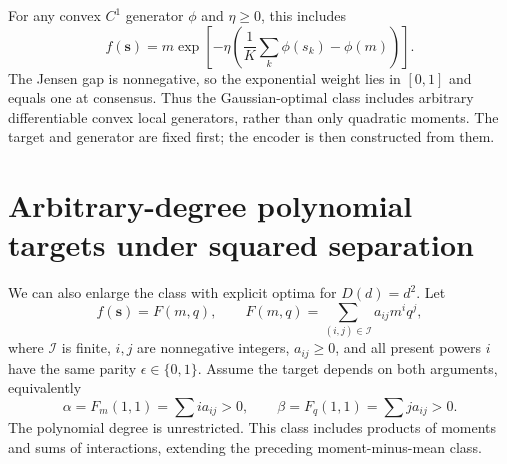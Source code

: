 \documentclass[11pt,letterpaper]{article}
\theoremstyle{remark}
\begin{document}
For any convex $C^1$ generator $\phi$ and $\eta\ge0$, this includes
$$
 f(\mathbf s)=m\exp\!\left[-\eta\left(\frac1K\sum_k\phi(s_k)-\phi(m)\right)\right].
$$
The Jensen gap is nonnegative, so the exponential weight lies in $[0,1]$ and equals one at consensus. Thus the Gaussian-optimal class includes arbitrary differentiable convex local generators, rather than only quadratic moments. The target and generator are fixed first; the encoder is then constructed from them.

\section{Arbitrary-degree polynomial targets under squared separation}
We can also enlarge the class with explicit optima for $D(d)=d^2$. Let
\begin{equation}
 f(\mathbf s)=F(m,q),\qquad
 F(m,q)=\sum_{(i,j)\in\mathcal I}a_{ij}m^i q^j,
 \label{eq:polyclass}
\end{equation}
where $\mathcal I$ is finite, $i,j$ are nonnegative integers, $a_{ij}\ge0$, and all present powers $i$ have the same parity $\epsilon\in\{0,1\}$. Assume the target depends on both arguments, equivalently
$$
 \alpha=F_m(1,1)=\sum i a_{ij}>0,\qquad
 \beta=F_q(1,1)=\sum j a_{ij}>0.
$$
The polynomial degree is unrestricted. This class includes products of moments and sums of interactions, extending the preceding moment-minus-mean class.
\end{document}
